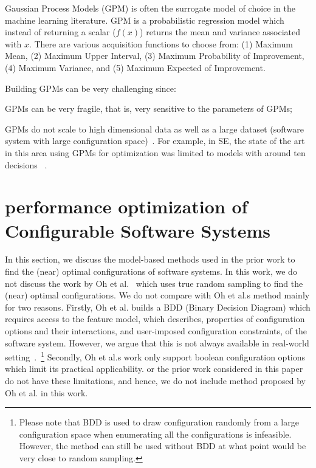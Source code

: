 Gaussian Process Models (GPM) is often the surrogate model of choice in the machine learning literature.
GPM is a probabilistic regression model which instead of returning a scalar ($f(x)$) returns the mean and variance associated with $x$. There are various acquisition functions  to choose from: (1) Maximum Mean, (2) Maximum Upper Interval, (3) Maximum Probability of Improvement, (4) Maximum Variance, and (5) Maximum Expected of Improvement. 

\noindent Building GPMs can be very challenging since:\label{sec:bo_shortcomings}
\bi[leftmargin=*]
\item
GPMs can be very fragile, that is, very sensitive to the parameters of GPMs;
\item
GPMs do not scale to  high dimensional data as well as a large dataset (software system with large configuration space)~\cite{shen2006fast}. For example, in SE, the state of the art in this area using GPMs for  optimization was
limited to models with around ten decisions ~\cite{wang2016bayesian}.
\ei


\section{performance optimization of Configurable Software Systems}
In this section, we discuss the model-based methods used in the prior work to find the (near) optimal configurations of software systems. In this work, we do not discuss the work by Oh et al.~\cite{oh2017finding} which uses true random sampling to find the (near) optimal configurations. We do not compare \flash with Oh et al.\textquotesingle s method mainly for two reasons. Firstly, Oh et al. builds a BDD (Binary Decision Diagram) which requires access to the feature model, which describes, properties of configuration options and their interactions, and user-imposed configuration constraints,  of the software system. However, we argue that this is not always available in real-world setting~\cite{she2011reverse}.~\footnote{Please note that BDD is used to draw configuration randomly from a large configuration space when enumerating all the configurations is infeasible. However, the method can still be used without BDD at what point would be very close to random sampling.} Secondly, Oh et al.\textquotesingle s work only support boolean configuration options which limit its practical applicability. \flash or the prior work considered in this paper do not have these limitations, and hence, we do not include method proposed by Oh et al. in this work.
